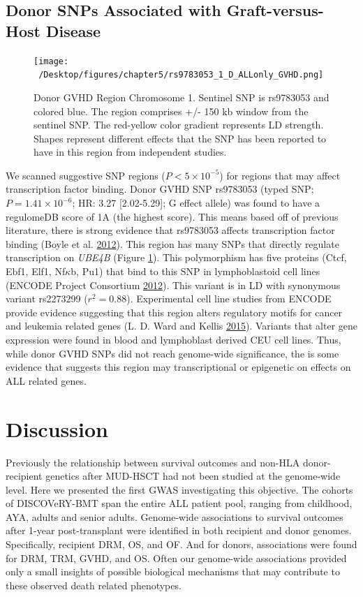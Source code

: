 \documentclass[]{DissertateOSU}
\begin{document}
\subsection{Donor SNPs Associated with Graft-versus-Host
Disease}\label{donor-snps-associated-with-graft-versus-host-disease}

\begin{figure}
    \centering
    \texttt{[image: ~/Desktop/figures/chapter5/rs9783053\_1\_D\_ALLonly\_GVHD.png]}
    \caption[Donor GVHD Region Chromosome 1.]{Donor GVHD Region Chromosome 1. Sentinel SNP is rs9783053 and colored blue. The region comprises +/- 150 kb window from the sentinel SNP. The red-yellow color gradient represents LD strength. Shapes represent different effects that the SNP has been reported to have in this region from independent studies.}
    \label{fig:d_gvhd_1y}  
\end{figure}

We scanned suggestive SNP regions (\(P < 5\times{10}^{-5}\)) for regions
that may affect transcription factor binding. Donor GVHD SNP rs9783053
(typed SNP; \(P=1.41\times{10}^{-6}\); HR: 3.27 {[}2.02-5.29{]}; G
effect allele) was found to have a regulomeDB score of 1A (the highest
score). This means based off of previous literature, there is strong
evidence that rs9783053 affects transcription factor binding (Boyle et
al. \protect\hyperlink{ref-Boyle_2012}{2012}). This region has many SNPs
that directly regulate transcription on \emph{UBE4B} (Figure
\ref{fig:d_gvhd_1y}). This polymorphism has five proteins (Ctcf, Ebf1,
Elf1, Nf\(\kappa\)b, Pu1) that bind to this SNP in lymphoblastoid cell
lines (ENCODE Project Consortium
\protect\hyperlink{ref-encode_2012}{2012}). This variant is in LD with
synonymous variant rs2273299 (\(r^2=0.88\)). Experimental cell line
studies from ENCODE provide evidence suggesting that this region alters
regulatory motifs for cancer and leukemia related genes (L. D. Ward and
Kellis \protect\hyperlink{ref-haploreg}{2015}). Variants that alter gene
expression were found in blood and lymphoblast derived CEU cell lines.
Thus, while donor GVHD SNPs did not reach genome-wide significance, the
is some evidence that suggests this region may transcriptional or
epigenetic on effects on ALL related genes.

\section{Discussion}\label{discussion-4}

Previously the relationship between survival outcomes and non-HLA
donor-recipient genetics after MUD-HSCT had not been studied at the
genome-wide level. Here we presented the first GWAS investigating this
objective. The cohorts of DISCOVeRY-BMT span the entire ALL patient
pool, ranging from childhood, AYA, adults and senior adults. Genome-wide
associations to survival outcomes after 1-year post-transplant were
identified in both recipient and donor genomes. Specifically, recipient
DRM, OS, and OF. And for donors, associations were found for DRM, TRM,
GVHD, and OS. Often our genome-wide associations provided only a small
insights of possible biological mechanisms that may contribute to these
observed death related phenotypes.
\end{document}
